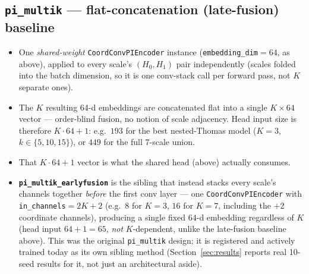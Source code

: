 \documentclass[11pt]{article}
\begin{document}
\subsection{\texttt{pi\_multik} --- flat-concatenation (late-fusion) baseline}
\begin{itemize}
  \item One \emph{shared-weight} \texttt{CoordConvPIEncoder} instance
    (\texttt{embedding\_dim}$=64$, as above), applied to every scale's
    $(H_0,H_1)$ pair independently (scales folded into the batch dimension, so
    it is one conv-stack call per forward pass, not $K$ separate ones).
  \item The $K$ resulting 64-d embeddings are concatenated flat into a single
    $K\times64$ vector — order-blind fusion, no notion of scale adjacency. Head
    input size is therefore $K\cdot64 + 1$: e.g.\ $193$ for the best nested-Thomas
    model ($K=3$, $k\in\{5,10,15\}$), or $449$ for the full 7-scale union.
  \item That $K\cdot64+1$ vector is what the shared head (above) actually
    consumes.
  \item \textbf{\texttt{pi\_multik\_earlyfusion}} is the sibling that instead
    stacks every scale's channels together \emph{before} the first conv layer —
    one \texttt{CoordConvPIEncoder} with \texttt{in\_channels}$=2K+2$ (e.g.\
    $8$ for $K=3$, $16$ for $K=7$, including the $+2$ coordinate channels),
    producing a single fixed $64$-d embedding regardless of $K$ (head input
    $64+1=65$, \emph{not} $K$-dependent, unlike the late-fusion baseline above).
    This was the original \texttt{pi\_multik} design; it is registered and
    actively trained today as its own sibling method (Section~\ref{sec:results}
    reports real 10-seed results for it, not just an architectural aside).
\end{itemize}
\end{document}

